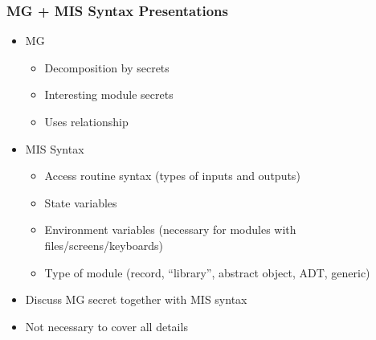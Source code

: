 \documentclass[t, 12pt, numbers, fleqn, handout]{beamer}
\begin{document}



\begin{frame}
\frametitle{MG + MIS Syntax Presentations}
\begin{itemize}
\item MG
\begin{itemize}
\item Decomposition by secrets
\item Interesting module secrets
\item Uses relationship
\end{itemize}
\item MIS Syntax
\begin{itemize}
\item Access routine syntax (types of inputs and outputs)
\item State variables
\item Environment variables (necessary for modules with files/screens/keyboards)
\item Type of module (record, ``library'', abstract object, ADT, generic)
\end{itemize}
\item Discuss MG secret together with MIS syntax
\item Not necessary to cover all details
\end{itemize}
\end{frame}

\end{document}
